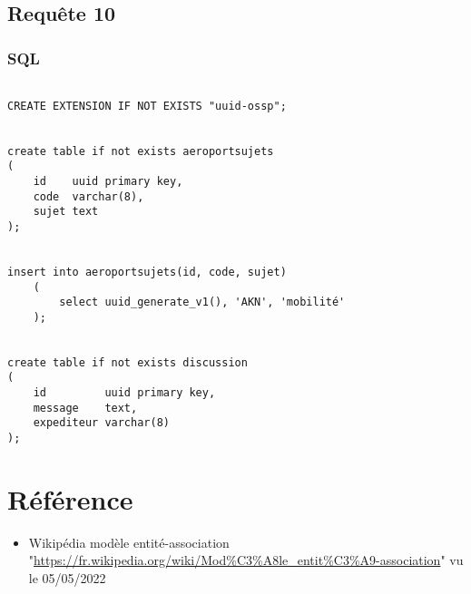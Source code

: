 \documentclass[french, utf8]{article}
\begin{document}
\subsection{Requête 10}
\subsubsection{SQL}

\begin{verbatim}

CREATE EXTENSION IF NOT EXISTS "uuid-ossp";


create table if not exists aeroportsujets
(
    id    uuid primary key,
    code  varchar(8),
    sujet text
);


insert into aeroportsujets(id, code, sujet)
    (
        select uuid_generate_v1(), 'AKN', 'mobilité'
    );


create table if not exists discussion
(
    id         uuid primary key,
    message    text,
    expediteur varchar(8)
);

\end{verbatim}

\section{Référence} \label{sec:ref}

\begin{itemize}
    \item Wikipédia modèle entité-association "\url{https://fr.wikipedia.org/wiki/Mod%C3%A8le_entit%C3%A9-association}" vu le 05/05/2022
\end{itemize}
\end{document}
